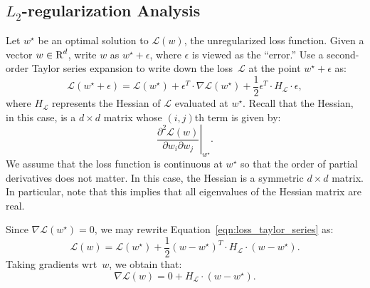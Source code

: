 \subsection{$L_2$-regularization Analysis}
Let $w^{\star}$ be an optimal solution to $\mathscr{L}(w)$, the unregularized 
loss function. Given a vector $w \in \text{R}^{d}$, write $w$ as $w^{\star} + \epsilon$, 
where $\epsilon$ is viewed as the ``error.'' Use a second-order Taylor series  
expansion to write down the loss~$\mathscr{L}$ at the point $w^{\star} + \epsilon$ 
as:
\begin{equation}
\label{eqn:loss_taylor_series}
\mathscr{L}(w^{\star} + \epsilon) = 
    \mathscr{L}(w^{\star}) + 
    \epsilon^{T} \cdot \nabla \mathscr{L}(w^{\star}) +
    \frac{1}{2} \epsilon^{T} \cdot H_{\mathscr{L}} \cdot \epsilon,
\end{equation}
where $H_{\mathscr{L}}$ represents the Hessian of $\mathscr{L}$ evaluated at 
$w^{\star}$. Recall that the Hessian, in this case, is a $d \times d$ matrix 
whose $(i, j)$th term is given by:
\[
    \left . \frac{\partial^2 \mathscr{L}(w)}{\partial w_i \partial w_j} \right |_{w^{\star}}.
\]
We assume that the loss function is continuous at $w^{\star}$ so that the order 
of partial derivatives does not matter. In this case, the Hessian is a symmetric 
$d \times d$ matrix. In particular, note that this implies that all eigenvalues 
of the Hessian matrix are real. 

Since $\nabla \mathscr{L}(w^{\star}) = 0$, we may rewrite 
Equation~\ref{eqn:loss_taylor_series} as:
\[
    \mathscr{L}(w) = \mathscr{L}(w^{\star}) + 
    \frac{1}{2} (w - w^{\star})^{T} \cdot H_{\mathscr{L}} \cdot (w - w^{\star}).
\]
Taking gradients wrt~$w$, we obtain that:
\begin{equation}
\label{eqn:loss_func_grad}
    \nabla \mathscr{L}(w) = 0 + H_{\mathscr{L}} \cdot (w - w^{\star}).
\end{equation}

